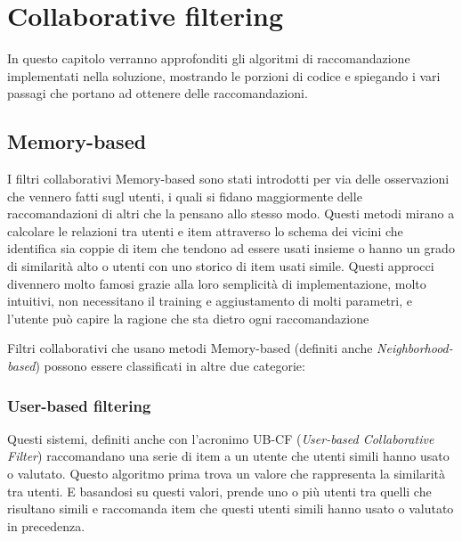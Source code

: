 \chapter{Collaborative filtering}
\label{chp:03-recommendationSystems}
In questo capitolo verranno approfonditi gli algoritmi di raccomandazione implementati nella soluzione, mostrando le porzioni di 
codice e spiegando i vari passagi che portano ad ottenere delle raccomandazioni.








\section{Memory-based} 
I filtri collaborativi Memory-based sono stati introdotti per via delle osservazioni che vennero fatti sugl utenti, i quali si fidano
maggiormente delle raccomandazioni di altri che la pensano allo stesso modo. Questi metodi mirano a calcolare le relazioni tra utenti
e item attraverso lo schema dei vicini che identifica sia coppie di item che tendono ad essere usati insieme o hanno un grado di 
similarità alto o utenti con uno storico di item usati simile. \cite{taxonomy-of-recommender-agents-on-the-internet}
Questi approcci divennero molto famosi grazie alla loro semplicità di implementazione, molto intuitivi, non necessitano il training e
aggiustamento di molti parametri, e l'utente può capire la ragione che sta dietro ogni raccomandazione 

Filtri collaborativi che usano metodi Memory-based (definiti anche \textit{Neighborhood-based}) possono essere classificati in altre due
categorie:


\subsection{User-based filtering} 
Questi sistemi, definiti anche con l'acronimo UB-CF (\textit{User-based Collaborative Filter}) raccomandano una serie di item a 
un utente che utenti simili hanno usato o valutato. Questo algoritmo prima trova un valore che rappresenta la similarità tra utenti. 
E basandosi su questi valori, prende uno o più utenti tra quelli che risultano simili e raccomanda item che questi utenti simili 
hanno usato o valutato in precedenza.

